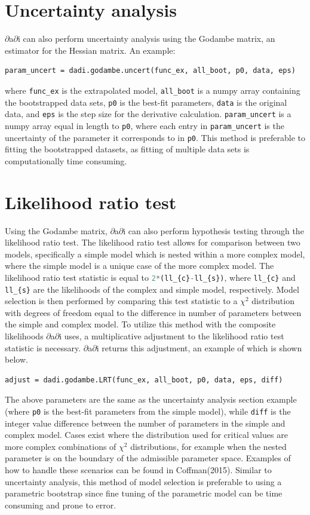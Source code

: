 \documentclass[12pt]{article}
\makeatletter
\newcommand{\dadi}{$\partial$a$\partial$i\xspace}
\newcommand{\py}[1]{\lstinline[language=Python, showstringspaces=False]@#1@}
\makeatother
\begin{document}
\section{Uncertainty analysis}
\dadi can also perform uncertainty analysis using the Godambe matrix, an estimator for the Hessian matrix.
An example:
\begin{lstlisting}
param_uncert = dadi.godambe.uncert(func_ex, all_boot, p0, data, eps)
\end{lstlisting}
where \py{func_ex} is the extrapolated model, \py{all_boot} is a numpy array containing the bootstrapped data sets, \py{p0} is the best-fit parameters, \py{data} is the original data, and \py{eps} is the step size for the derivative calculation.
\py{param_uncert} is a numpy array equal in length to \py{p0}, where each entry in \py{param_uncert} is the uncertainty of the parameter it corresponds to in \py{p0}.
This method is preferable to fitting the bootstrapped datasets, as fitting of multiple data sets is computationally time consuming.

\section{Likelihood ratio test}
Using the Godambe matrix, \dadi can also perform hypothesis testing through the likelihood ratio test.
The likelihood ratio test allows for comparison between two models, specifically a simple model which is nested within a more complex model, where the simple model is a unique case of the more complex model.
The likelihood ratio test statistic is equal to \py{2*(ll_{c}-ll_{s})}, where \py{ll_{c}} and \py{ll_{s}} are the likelihoods of the complex and simple model, respectively.
Model selection is then performed by comparing this test statistic to a $\chi^2$ distribution with degrees of freedom equal to the difference in number of parameters between the simple and complex model.
To utilize this method with the composite likelihoods \dadi uses, a multiplicative adjustment to the likelihood ratio test statistic is necessary.
\dadi returns this adjustment, an example of which is shown below.
\begin{lstlisting}
adjust = dadi.godambe.LRT(func_ex, all_boot, p0, data, eps, diff)
\end{lstlisting}
The above parameters are the same as the uncertainty analysis section example (where \py{p0} is the best-fit parameters from the simple model), while \py{diff} is the integer value difference between the number of parameters in the simple and complex model.
Cases exist where the distribution used for critical values are more complex combinations of $\chi^2$ distributions, for example when the nested parameter is on the boundary of the admissible parameter space.
Examples of how to handle these scenarios can be found in Coffman(2015).
Similar to uncertainty analysis, this method of model selection is preferable to using a parametric bootstrap since fine tuning of the parametric model can be time consuming and prone to error.
\end{document}
